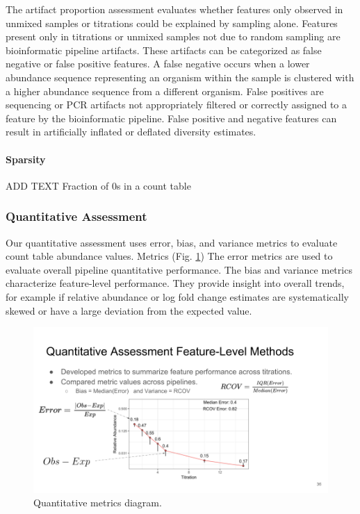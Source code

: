\documentclass[linenumbers]{bmcart}
\begin{document}
The artifact proportion assessment evaluates whether features only observed in
unmixed samples or titrations could be explained by sampling alone.
Features present only in titrations or unmixed samples not due to random
sampling are bioinformatic pipeline artifacts. These artifacts can be
categorized as false negative or false positive features. A false
negative occurs when a lower abundance sequence representing an organism
within the sample is clustered with a higher abundance sequence from a
different organism. False positives are sequencing or PCR artifacts not
appropriately filtered or correctly assigned to a feature by the
bioinformatic pipeline.
False positive and negative features can result in artificially inflated or deflated diversity estimates.


\paragraph{Sparsity}
ADD TEXT
Fraction of 0s in a count table


\subsubsection*{Quantitative Assessment}
Our quantitative assessment uses error, bias, and variance metrics to evaluate count table abundance values.
Metrics (Fig. \ref{fig:quantMetrics})
The error metrics are used to evaluate overall pipeline quantitative performance.
The bias and variance metrics characterize feature-level performance.
They provide insight into overall trends, for example if relative abundance or log fold change estimates are systematically skewed or have a large deviation from the expected value.

\begin{figure}
\centering
\includegraphics{quant_metrics.png}
\caption{\label{fig:quantMetrics} Quantitative metrics diagram.}
\end{figure}
\end{document}
